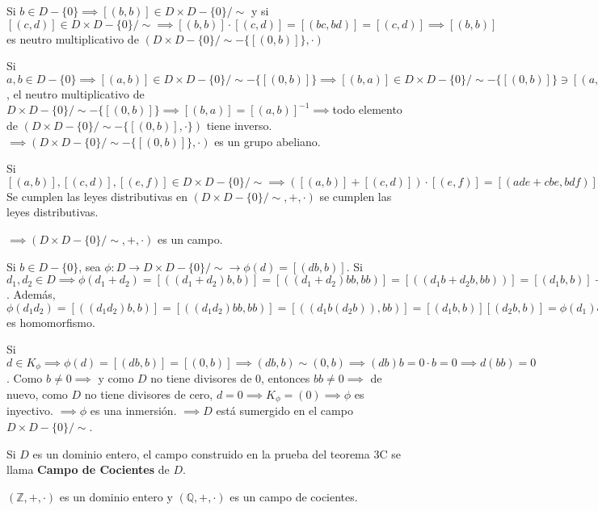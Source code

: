 \begin{teorema}[3C]
\begin{dem}
        Si $b\in D-\{0\}\implies [(b,b)]\in D\times D-\{0\}/\sim$ y si $[(c,d)]\in D\times D-\{0\}/\sim\implies \left[(b,b)\right]\cdot [(c,d)]=[(bc,bd)]=[(c,d)]\implies [(b,b)]$ es neutro multiplicativo de $\left(D\times D-\{0\}/\sim - \{[(0,b)]\},\cdot\right)$\bigbreak 

        Si $a,b\in D-\{0\}\implies [(a,b)]\in D\times D-\{0\}/\sim - \{[(0,b)]\}\implies [(b,a)]\in D\times D-\{0\}/\sim -\{[(0,b)]\}\ni [(a,b)]\cdot [(b,a)]=[(ab,ba)]=[(ab,ab)]$, el neutro multiplicativo de $D\times D-\{0\}/\sim -\{[(0,b)]\}\implies [(b,a)]=[(a,b)]^{-1}\implies$todo elemento de $(D\times D -\{0\}/\sim -\{[(0,b)],\cdot\})$ tiene inverso. $\implies \left(D\times D-\{0\}/\sim -\{[(0,b)]\},\cdot\right)$ es un grupo abeliano. \bigbreak 

        Si $[(a,b)],[(c,d)],[(e,f)]\in D\times D-\{0\}/\sim \implies ([(a,b)]+[(c,d)])\cdot [(e,f)]= [(ade+cbe,bdf)]=[((ade+cbe)f,(b+f)f)]= [(ae)(df)+(bf)(ce), (bf)(df)]=[(ae,bf)]+[(ce,df)]\implies$ Se cumplen las leyes distributivas en $(D\times D-\{0\}/\sim,+,\cdot)$ se cumplen las leyes distributivas.\bigbreak 
        
        $\implies \left(D\times D-\{0\}/\sim, +,\cdot\right)$ es un campo. \bigbreak
        
        Si $b\in D-\{0\}$, sea $\phi: D\to D\times D-\{0\}/\sim \to \phi(d)= [(db,b)]$. Si $d_1,d_2\in D\implies \phi(d_1+d_2)=[((d_1+d_2)b, b)]=[((d_1+d_2)bb, bb)]=[((d_1b + d_2b,bb))]= [(d_1b,b)]+[(d_2b,b)]=\phi(d_1)+\phi(d_2)$. Además, $\phi(d_1d_2)=[((d_1d_2)b,b)]=[((d_1d_2)bb,bb)]=[((d_1b(d_2b)),bb)]=[(d_1b,b)][(d_2b,b)]=\phi(d_1)\phi(d_2)\implies \phi$ es homomorfismo.\bigbreak 
        
        Si $d\in K_\phi \implies\phi(d)=[(db,b)]=[(0,b)]\implies (db,b)\sim (0,b)\implies (db)b=0\cdot b=0\implies d(bb)=0$. Como $b\neq 0\implies$ y como $D$ no tiene divisores de 0, entonces $bb\neq 0\implies$ de nuevo, como $D$ no tiene divisores de cero, $d=0\implies K_\phi = (0)\implies \phi$ es inyectivo. $\implies \phi$ es una inmersión. $\implies D$ está sumergido en el campo $D\times D-\{0\}/\sim$.
    \end{dem}
\end{teorema}

\begin{definicion}
    Si $D$ es un dominio entero, el campo construido en la prueba del teorema 3C se llama \textbf{Campo de Cocientes} de $D$.
\end{definicion}

\begin{ejemplo}
    $(\mathbb{Z},+,\cdot)$ es un dominio entero y $(\mathbb{Q},+,\cdot)$ es un campo de cocientes. 
\end{ejemplo}